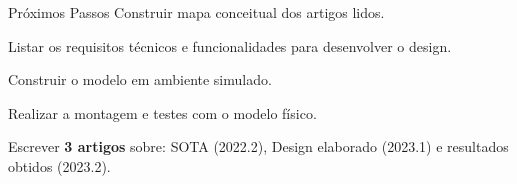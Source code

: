 







\begin{frame}[t]{Próximos Passos}
    \newcommand\vertspaceproximos{0.35cm}
    Construir mapa conceitual dos artigos lidos.
    \vspace*{\vertspaceproximos}

    Listar os requisitos técnicos e funcionalidades para desenvolver o design.
    \vspace*{\vertspaceproximos}

    Construir o modelo em ambiente simulado.
    \vspace*{\vertspaceproximos}

    Realizar a montagem e testes com o modelo físico.
    \vspace*{\vertspaceproximos}

    Escrever \textbf{3 artigos} sobre: SOTA (2022.2), Design elaborado (2023.1) e resultados obtidos (2023.2).
    \vspace*{\vertspaceproximos}
\end{frame}
